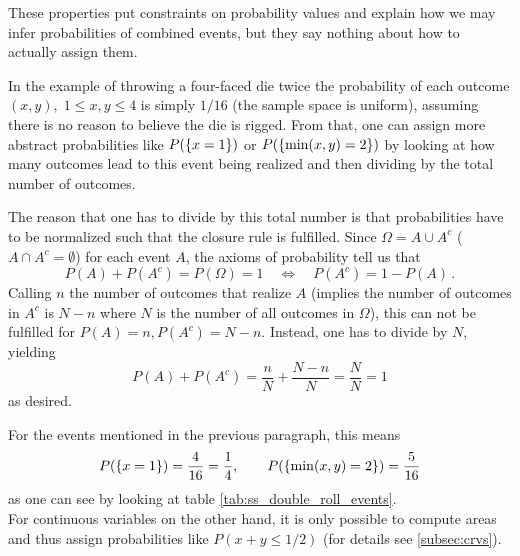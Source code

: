 These properties put constraints on probability values and explain how we may infer probabilities of combined events, but they say nothing about how to actually assign them.

\begin{ex}
In the example of throwing a four-faced die twice the probability of each outcome $(x, y), \; 1 \leq x, y \leq 4$ is simply $1 / 16$ (the sample space is uniform), assuming there is no reason to believe the die is rigged. From that, one can assign more abstract probabilities like $P(\qty{x = 1})$ or $P(\qty{\min(x, y) = 2})$ by looking at how many outcomes lead to this event being realized and then dividing by the total number of outcomes.

The reason that one has to divide by this total number is that probabilities have to be normalized such that the closure rule is fulfilled. Since $\Omega = A \cup A^c$ ($A \cap A^c = \emptyset$) for each event $A$, the axioms of probability tell us that
\begin{equation}
P(A) + P(A^c) = P(\Omega) = 1 \quad \Leftrightarrow \quad P(A^c) = 1 - P(A) \, .
\end{equation}
Calling $n$ the number of outcomes that realize $A$ (implies the number of outcomes in $A^c$ is $N - n$ where $N$ is the number of all outcomes in $\Omega$), this can not be fulfilled for $P(A) = n, P(A^c) = N - n$. Instead, one has to divide by $N$, yielding
\begin{equation*}
P(A) + P(A^c) = \frac{n}{N} + \frac{N - n}{N} = \frac{N}{N} = 1
\end{equation*}
as desired.


For the events mentioned in the previous paragraph, this means
\begin{equation*}
P(\qty{x = 1}) = \frac{4}{16} = \frac{1}{4}, \qquad P(\qty{\min(x, y) = 2}) = \frac{5}{16}
\end{equation*}
as one can see by looking at table \ref{tab:ss_double_roll_events}.\\


For continuous variables on the other hand, it is only possible to compute areas and thus assign probabilities like $P(x + y \leq 1/ 2)$ (for details see \ref{subsec:crvs}).
\end{ex}


